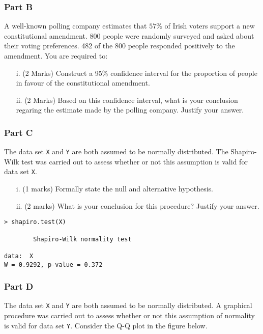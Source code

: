 \documentclass[a4paper,12pt]{article}
\begin{document}
\subsubsection*{Part B} %
A well-known polling company estimates that $57\%$ of Irish voters support a new constitutional amendment. 800 people were randomly surveyed and asked about their voting preferences. 482 of the 800 people responded positively to the amendment. You are required to:

\begin{itemize}
\item [i.](2 Marks) Construct a 95\% confidence interval for the proportion of people in favour of the constitutional amendment.
\item[ii.] (2 Marks) Based on this confidence interval, what is your conclusion regaring the estimate made by the polling company. Justify your answer.
\end{itemize}

\subsubsection*{Part C} %
 The data set \texttt{X} and \texttt{Y} are both assumed to be normally distributed. The Shapiro-Wilk test was carried out to assess whether or not this assumption is valid for data set \texttt{X}.
\begin{itemize}
\item[i.] (1 marks) Formally state the null and alternative hypothesis.
\item[ii.] (2 marks) What is your conclusion for this procedure? Justify your answer.
\end{itemize}
\begin{framed}
\begin{verbatim}
> shapiro.test(X)

        Shapiro-Wilk normality test

data:  X
W = 0.9292, p-value = 0.372
\end{verbatim}
\end{framed}
\bigskip
\newpage
\subsubsection*{Part D}
The data set \texttt{X} and \texttt{Y} are both assumed to be normally distributed. A graphical procedure was carried out to assess whether or not this assumption of normality is valid for data set \texttt{Y}. Consider the Q-Q plot in the figure below.
\end{document}
